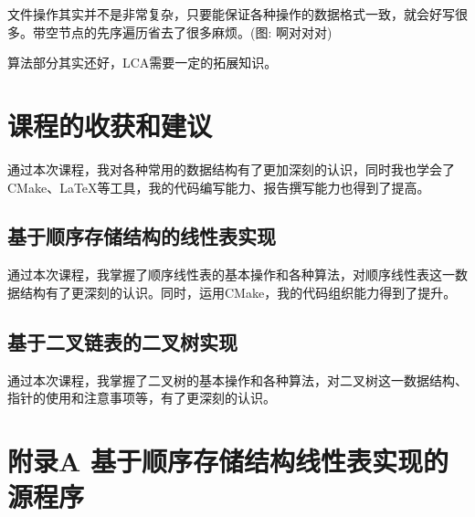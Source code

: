 \documentclass[supercite]{Experimental_Report}
\theoremstyle{definition}
\begin{document}
文件操作其实并不是非常复杂，只要能保证各种操作的数据格式一致，就会好写很多。带空节点的先序遍历省去了很多麻烦。(图: 啊对对对)

算法部分其实还好，LCA需要一定的拓展知识。

\newpage

\section{课程的收获和建议}

通过本次课程，我对各种常用的数据结构有了更加深刻的认识，同时我也学会了CMake、LaTeX等工具，我的代码编写能力、报告撰写能力也得到了提高。

\subsection{基于顺序存储结构的线性表实现}

通过本次课程，我掌握了顺序线性表的基本操作和各种算法，对顺序线性表这一数据结构有了更深刻的认识。同时，运用CMake，我的代码组织能力得到了提升。

\subsection{基于二叉链表的二叉树实现}

通过本次课程，我掌握了二叉树的基本操作和各种算法，对二叉树这一数据结构、指针的使用和注意事项等，有了更深刻的认识。



\appendix

\section{附录A 基于顺序存储结构线性表实现的源程序}
\end{document}
